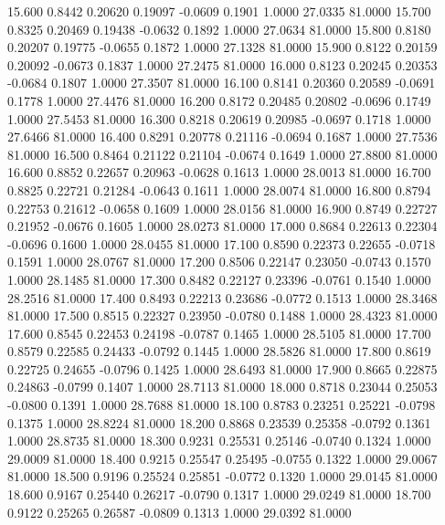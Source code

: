   15.600   0.8442   0.20620   0.19097  -0.0609   0.1901   1.0000  27.0335  81.0000
  15.700   0.8325   0.20469   0.19438  -0.0632   0.1892   1.0000  27.0634  81.0000
  15.800   0.8180   0.20207   0.19775  -0.0655   0.1872   1.0000  27.1328  81.0000
  15.900   0.8122   0.20159   0.20092  -0.0673   0.1837   1.0000  27.2475  81.0000
  16.000   0.8123   0.20245   0.20353  -0.0684   0.1807   1.0000  27.3507  81.0000
  16.100   0.8141   0.20360   0.20589  -0.0691   0.1778   1.0000  27.4476  81.0000
  16.200   0.8172   0.20485   0.20802  -0.0696   0.1749   1.0000  27.5453  81.0000
  16.300   0.8218   0.20619   0.20985  -0.0697   0.1718   1.0000  27.6466  81.0000
  16.400   0.8291   0.20778   0.21116  -0.0694   0.1687   1.0000  27.7536  81.0000
  16.500   0.8464   0.21122   0.21104  -0.0674   0.1649   1.0000  27.8800  81.0000
  16.600   0.8852   0.22657   0.20963  -0.0628   0.1613   1.0000  28.0013  81.0000
  16.700   0.8825   0.22721   0.21284  -0.0643   0.1611   1.0000  28.0074  81.0000
  16.800   0.8794   0.22753   0.21612  -0.0658   0.1609   1.0000  28.0156  81.0000
  16.900   0.8749   0.22727   0.21952  -0.0676   0.1605   1.0000  28.0273  81.0000
  17.000   0.8684   0.22613   0.22304  -0.0696   0.1600   1.0000  28.0455  81.0000
  17.100   0.8590   0.22373   0.22655  -0.0718   0.1591   1.0000  28.0767  81.0000
  17.200   0.8506   0.22147   0.23050  -0.0743   0.1570   1.0000  28.1485  81.0000
  17.300   0.8482   0.22127   0.23396  -0.0761   0.1540   1.0000  28.2516  81.0000
  17.400   0.8493   0.22213   0.23686  -0.0772   0.1513   1.0000  28.3468  81.0000
  17.500   0.8515   0.22327   0.23950  -0.0780   0.1488   1.0000  28.4323  81.0000
  17.600   0.8545   0.22453   0.24198  -0.0787   0.1465   1.0000  28.5105  81.0000
  17.700   0.8579   0.22585   0.24433  -0.0792   0.1445   1.0000  28.5826  81.0000
  17.800   0.8619   0.22725   0.24655  -0.0796   0.1425   1.0000  28.6493  81.0000
  17.900   0.8665   0.22875   0.24863  -0.0799   0.1407   1.0000  28.7113  81.0000
  18.000   0.8718   0.23044   0.25053  -0.0800   0.1391   1.0000  28.7688  81.0000
  18.100   0.8783   0.23251   0.25221  -0.0798   0.1375   1.0000  28.8224  81.0000
  18.200   0.8868   0.23539   0.25358  -0.0792   0.1361   1.0000  28.8735  81.0000
  18.300   0.9231   0.25531   0.25146  -0.0740   0.1324   1.0000  29.0009  81.0000
  18.400   0.9215   0.25547   0.25495  -0.0755   0.1322   1.0000  29.0067  81.0000
  18.500   0.9196   0.25524   0.25851  -0.0772   0.1320   1.0000  29.0145  81.0000
  18.600   0.9167   0.25440   0.26217  -0.0790   0.1317   1.0000  29.0249  81.0000
  18.700   0.9122   0.25265   0.26587  -0.0809   0.1313   1.0000  29.0392  81.0000
